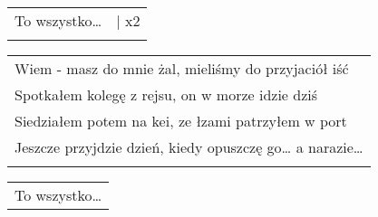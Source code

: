 \documentclass[a5paper]{article}
\begin{document}
\noindent
\begin{tabular}{@{}p{3cm}p{3cm}@{}}
To wszystko… & | x2\\ \\
\end{tabular}

\noindent
\begin{tabular}{@{}p{9.5cm}@{}}
Wiem - masz do mnie żal, mieliśmy do przyjaciół iść \\
Spotkałem kolegę z rejsu, on w morze idzie dziś \\
Siedziałem potem na kei, ze łzami patrzyłem w port \\
Jeszcze przyjdzie dzień, kiedy opuszczę go… a narazie… \\ \\
\end{tabular}

\noindent
\begin{tabular}{@{}p{8.5cm}@{}}
To wszystko…
\end{tabular}
\end{document}
